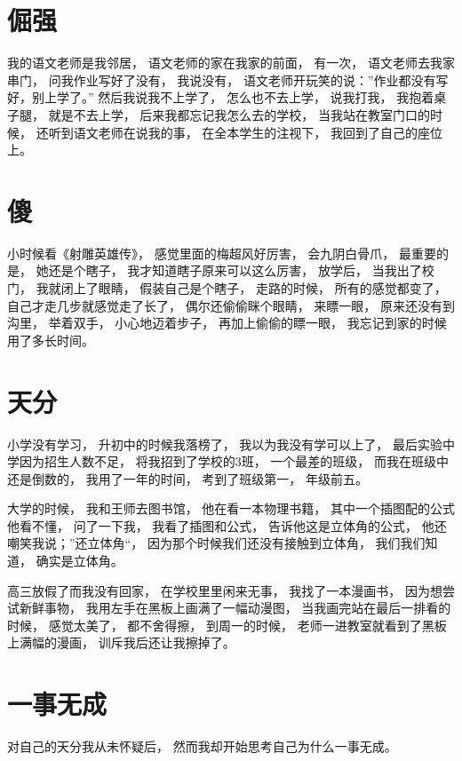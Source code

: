 \section{倔强}

我的语文老师是我邻居，
语文老师的家在我家的前面，
有一次，
语文老师去我家串门，
问我作业写好了没有，
我说没有，
语文老师开玩笑的说：''作业都没有写好，别上学了。''
然后我说我不上学了，
怎么也不去上学，
说我打我，
我抱着桌子腿，
就是不去上学，
后来我都忘记我怎么去的学校，
当我站在教室门口的时候，
还听到语文老师在说我的事，
在全本学生的注视下，
我回到了自己的座位上。


\section{傻}

小时候看《射雕英雄传》，
感觉里面的梅超风好厉害，
会九阴白骨爪，
最重要的是，
她还是个瞎子，
我才知道瞎子原来可以这么厉害，
放学后，
当我出了校门，
我就闭上了眼睛，
假装自己是个瞎子，
走路的时候，
所有的感觉都变了，
自己才走几步就感觉走了长了，
偶尔还偷偷眯个眼睛，
来瞟一眼，
原来还没有到沟里，
举着双手，
小心地迈着步子，
再加上偷偷的瞟一眼，
我忘记到家的时候用了多长时间。


\section{天分}

小学没有学习，
升初中的时候我落榜了，
我以为我没有学可以上了，
最后实验中学因为招生人数不足，
将我招到了学校的3班，
一个最差的班级，
而我在班级中还是倒数的，
我用了一年的时间，
考到了班级第一，
年级前五。

大学的时候，
我和王师去图书馆，
他在看一本物理书籍，
其中一个插图配的公式他看不懂，
问了一下我，
我看了插图和公式，
告诉他这是立体角的公式，
他还嘲笑我说；”还立体角“，
因为那个时候我们还没有接触到立体角，
我们我们知道，
确实是立体角。


高三放假了而我没有回家，
在学校里里闲来无事，
我找了一本漫画书，
因为想尝试新鲜事物，
我用左手在黑板上画满了一幅动漫图，
当我画完站在最后一排看的时候，
感觉太美了，
都不舍得擦，
到周一的时候，
老师一进教室就看到了黑板上满幅的漫画，
训斥我后还让我擦掉了。




\section{一事无成}

对自己的天分我从未怀疑后，
然而我却开始思考自己为什么一事无成。


